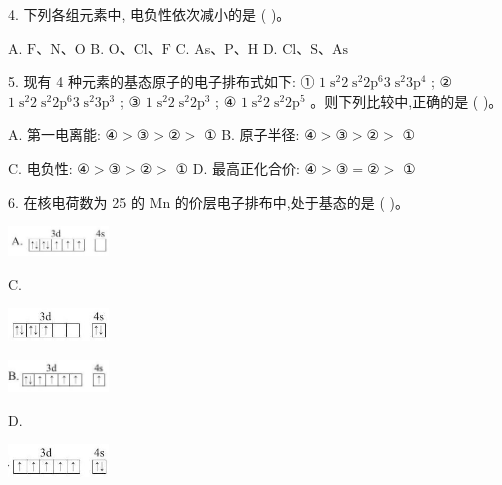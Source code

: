 \documentclass[10pt]{article}
\begin{document}
4. 下列各组元素中, 电负性依次减小的是 ( )。

A. \(\mathrm{F}\text{、}\mathrm{N}\text{、}\mathrm{O}\) B. \(\mathrm{O}\text{、}\mathrm{{Cl}}\text{、}\mathrm{F}\) C. As、P、H D. \(\mathrm{{Cl}}\text{、}\mathrm{S}\text{、}\mathrm{{As}}\)

5. 现有 4 种元素的基态原子的电子排布式如下: ① \(1{\mathrm{\;s}}^{2}2{\mathrm{\;s}}^{2}2{\mathrm{p}}^{6}3{\mathrm{\;s}}^{2}3{\mathrm{p}}^{4}\) ; ② \(1{\mathrm{\;s}}^{2}2{\mathrm{\;s}}^{2}2{\mathrm{p}}^{6}3{\mathrm{\;s}}^{2}3{\mathrm{p}}^{3}\) ; ③ \(1{\mathrm{\;s}}^{2}2{\mathrm{\;s}}^{2}2{\mathrm{p}}^{3}\) ; ④ \(1{\mathrm{\;s}}^{2}2{\mathrm{\;s}}^{2}2{\mathrm{p}}^{5}\) 。则下列比较中,正确的是 ( )。

A. 第一电离能: \(\text{④} > \text{③} > \text{②} >\) ① B. 原子半径: \(\text{④} > \text{③} > \text{②} >\) ①

C. 电负性: \(\text{④} > \text{③} > \text{②} >\) ① D. 最高正化合价: \(\text{④} > \text{③} = \text{②} >\) ①

6. 在核电荷数为 25 的 \(\mathrm{{Mn}}\) 的价层电子排布中,处于基态的是 ( )。

\begin{center}
\includegraphics[max width=0.2\textwidth]{images/0190e026-5a11-7df7-bd27-54d09026ba7a_34_277285.jpg}
\end{center}

C.

\begin{center}
\includegraphics[max width=0.2\textwidth]{images/0190e026-5a11-7df7-bd27-54d09026ba7a_34_332947.jpg}
\end{center}

\begin{center}
\includegraphics[max width=0.2\textwidth]{images/0190e026-5a11-7df7-bd27-54d09026ba7a_34_794336.jpg}
\end{center}

D.

\begin{center}
\includegraphics[max width=0.2\textwidth]{images/0190e026-5a11-7df7-bd27-54d09026ba7a_34_217807.jpg}
\end{center}
\end{document}

